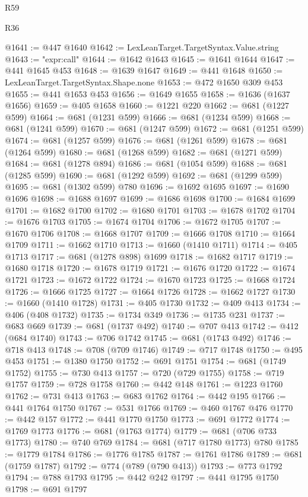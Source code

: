 \begin{lexlean}{R59}
\begin{lexlean}{R36}
\begin{coremodule}
{{{{{{{{{{{{{{{{{{{{{{{{{{{{{{{{{{{{{{{{{{{{{{{{{{{{{{{{{{{{{{{{{{{{{{{{{{{{{{{{{{@1641 := @447 @1640
@1642 := LexLeanTarget.TargetSyntax.Value.string
@1643 := "expr:call"
@1644 := @1642 @1643
@1645 := @1641 @1644
@1647 := @441 @1645 @453
@1648 := @1639 @1647
@1649 := @441 @1648
@1650 := LexLeanTarget.TargetSyntax.Shape.none
@1653 := @472 @1650 @309 @453
@1655 := @441 @1653 @453
@1656 := @1649 @1655
@1658 := @1636 (@1637 @1656)
@1659 := @405 @1658
@1660 := @1221 @220
@1662 := @681 (@1227 @599)
@1664 := @681 (@1231 @599)
@1666 := @681 (@1234 @599)
@1668 := @681 (@1241 @599)
@1670 := @681 (@1247 @599)
@1672 := @681 (@1251 @599)
@1674 := @681 (@1257 @599)
@1676 := @681 (@1261 @599)
@1678 := @681 (@1264 @599)
@1680 := @681 (@1268 @599)
@1682 := @681 (@1271 @599)
@1684 := @681 (@1278 @894)
@1686 := @681 (@1054 @599)
@1688 := @681 (@1285 @599)
@1690 := @681 (@1292 @599)
@1692 := @681 (@1299 @599)
@1695 := @681 (@1302 @599) @780
@1696 := @1692 @1695
@1697 := @1690 @1696
@1698 := @1688 @1697
@1699 := @1686 @1698
@1700 := @1684 @1699
@1701 := @1682 @1700
@1702 := @1680 @1701
@1703 := @1678 @1702
@1704 := @1676 @1703
@1705 := @1674 @1704
@1706 := @1672 @1705
@1707 := @1670 @1706
@1708 := @1668 @1707
@1709 := @1666 @1708
@1710 := @1664 @1709
@1711 := @1662 @1710
@1713 := @1660 (@1410 @1711)
@1714 := @405 @1713
@1717 := @681 (@1278 @898) @1699
@1718 := @1682 @1717
@1719 := @1680 @1718
@1720 := @1678 @1719
@1721 := @1676 @1720
@1722 := @1674 @1721
@1723 := @1672 @1722
@1724 := @1670 @1723
@1725 := @1668 @1724
@1726 := @1666 @1725
@1727 := @1664 @1726
@1728 := @1662 @1727
@1730 := @1660 (@1410 @1728)
@1731 := @405 @1730
@1732 := @409 @413
@1734 := @406 (@408 @1732)
@1735 := @1734 @349
@1736 := @1735 @231
@1737 := @683 @669
@1739 := @681 (@1737 @492)
@1740 := @707 @413
@1742 := @412 (@684 @1740)
@1743 := @706 @1742
@1745 := @681 (@1743 @492)
@1746 := @718 @413
@1748 := @708 (@709 @1746)
@1749 := @717 @1748
@1750 := @495 @453
@1751 := @1380 @1750
@1752 := @691 @1751
@1754 := @681 (@1749 @1752)
@1755 := @730 @413
@1757 := @720 (@729 @1755)
@1758 := @719 @1757
@1759 := @728 @1758
@1760 := @442 @148
@1761 := @1223 @1760
@1762 := @731 @413
@1763 := @683 @1762
@1764 := @442 @195
@1766 := @441 @1764 @1750
@1767 := @531 @1766
@1769 := @460 @1767 @476
@1770 := @442 @157
@1772 := @441 @1770 @1750
@1773 := @691 @1772
@1774 := @1769 @1773
@1776 := @681 (@1763 @1774)
@1779 := @681 (@706 @733 @1773)
@1780 := @740 @769
@1784 := @681 (@717 @1780 @1773) @780
@1785 := @1779 @1784
@1786 := @1776 @1785
@1787 := @1761 @1786
@1789 := @681 (@1759 @1787)
@1792 := @774 (@789 (@790 @413))
@1793 := @773 @1792
@1794 := @788 @1793
@1795 := @442 @242
@1797 := @441 @1795 @1750
@1798 := @691 @1797
}}}}}}}}}}}}}}}}}}}}}}}}}}}}}}}}}}}}}}}}}}}}}}}}}}}}}}}}}}}}}}}}}}}}}}}}}}}}}}}}}}
\end{coremodule}
\end{lexlean}
\end{lexlean}
